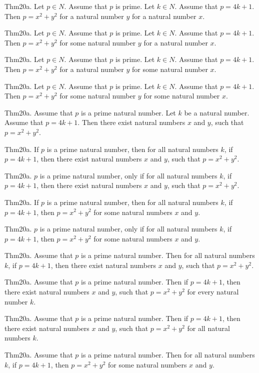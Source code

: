 \documentclass{article}
\begin{document}
Thm20a. Let $p \in N$. Assume that $p$ is prime. Let $k \in N$. Assume that $p = 4 k + 1$. Then $p = x ^{ 2}+ y ^{ 2}$ for a natural number $y$ for a natural number $x$.

Thm20a. Let $p \in N$. Assume that $p$ is prime. Let $k \in N$. Assume that $p = 4 k + 1$. Then $p = x ^{ 2}+ y ^{ 2}$ for some natural number $y$ for a natural number $x$.

Thm20a. Let $p \in N$. Assume that $p$ is prime. Let $k \in N$. Assume that $p = 4 k + 1$. Then $p = x ^{ 2}+ y ^{ 2}$ for a natural number $y$ for some natural number $x$.

Thm20a. Let $p \in N$. Assume that $p$ is prime. Let $k \in N$. Assume that $p = 4 k + 1$. Then $p = x ^{ 2}+ y ^{ 2}$ for some natural number $y$ for some natural number $x$.

Thm20a. Assume that $p$ is a prime natural number. Let $k$ be a natural number. Assume that $p = 4 k + 1$. Then there exist natural numbers $x$ and $y$, such that $p = x ^{ 2}+ y ^{ 2}$.

Thm20a. If $p$ is a prime natural number, then for all natural numbers $k$, if $p = 4 k + 1$, then there exist natural numbers $x$ and $y$, such that $p = x ^{ 2}+ y ^{ 2}$.

Thm20a. $p$ is a prime natural number, only if for all natural numbers $k$, if $p = 4 k + 1$, then there exist natural numbers $x$ and $y$, such that $p = x ^{ 2}+ y ^{ 2}$.

Thm20a. If $p$ is a prime natural number, then for all natural numbers $k$, if $p = 4 k + 1$, then $p = x ^{ 2}+ y ^{ 2}$ for some natural numbers $x$ and $y$.

Thm20a. $p$ is a prime natural number, only if for all natural numbers $k$, if $p = 4 k + 1$, then $p = x ^{ 2}+ y ^{ 2}$ for some natural numbers $x$ and $y$.

Thm20a. Assume that $p$ is a prime natural number. Then for all natural numbers $k$, if $p = 4 k + 1$, then there exist natural numbers $x$ and $y$, such that $p = x ^{ 2}+ y ^{ 2}$.

Thm20a. Assume that $p$ is a prime natural number. Then if $p = 4 k + 1$, then there exist natural numbers $x$ and $y$, such that $p = x ^{ 2}+ y ^{ 2}$ for every natural number $k$.

Thm20a. Assume that $p$ is a prime natural number. Then if $p = 4 k + 1$, then there exist natural numbers $x$ and $y$, such that $p = x ^{ 2}+ y ^{ 2}$ for all natural numbers $k$.

Thm20a. Assume that $p$ is a prime natural number. Then for all natural numbers $k$, if $p = 4 k + 1$, then $p = x ^{ 2}+ y ^{ 2}$ for some natural numbers $x$ and $y$.
\end{document}
